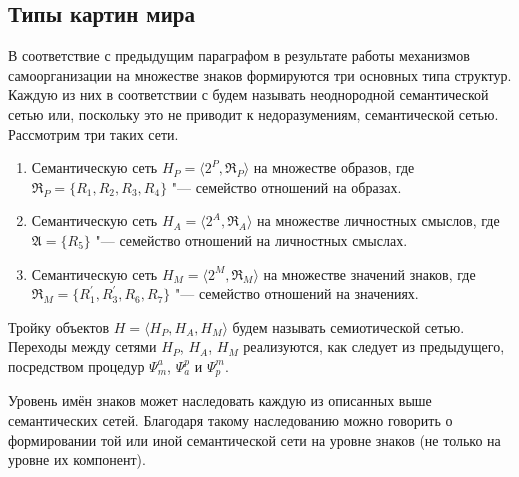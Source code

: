 \begin{appendices}
\chapter{Типы картин мира} \label{AppendixA}

В соответствие с предыдущим параграфом в результате работы механизмов самоорганизации на множестве знаков формируются три основных типа структур. Каждую из них в соответствии с \cite{Osipov1990} будем называть неоднородной семантической сетью или, поскольку это не приводит к недоразумениям, семантической сетью. Рассмотрим три таких сети.
\begin{enumerate}
	\renewcommand\labelenumi{\theenumi.}
	\item Семантическую сеть $H_P=\langle 2^P,\mathfrak R_P\rangle$ на множестве образов, где $\mathfrak R_P=\{R_1,R_2,R_3,R_4\}$ "--- семейство отношений на образах.
	\item Семантическую сеть $H_A=\langle 2^A,\mathfrak R_A\rangle$ на множестве личностных смыслов, где $\mathfrak A=\{R_5\}$ "--- семейство отношений на личностных смыслах.
	\item Семантическую сеть $H_M=\langle 2^M,\mathfrak R_M\rangle$ на множестве значений знаков, где $\mathfrak R_M=\{R_1^\prime,R_3^\prime,R_6,R_7\}$ "--- семейство отношений на значениях.
\end{enumerate}

Тройку объектов $H=\langle H_P,H_A,H_M\rangle$ будем называть семиотической сетью. Переходы между сетями $H_P$, $H_A$, $H_M$ реализуются, как следует из предыдущего, посредством процедур $\Psi_m^a$, $\Psi_a^p$ и $\Psi_p^m$.

Уровень имён знаков может наследовать каждую из описанных выше семантических сетей. Благодаря такому наследованию можно говорить о формировании той или иной семантической сети на уровне знаков (не только на уровне их компонент).


\end{appendices}
